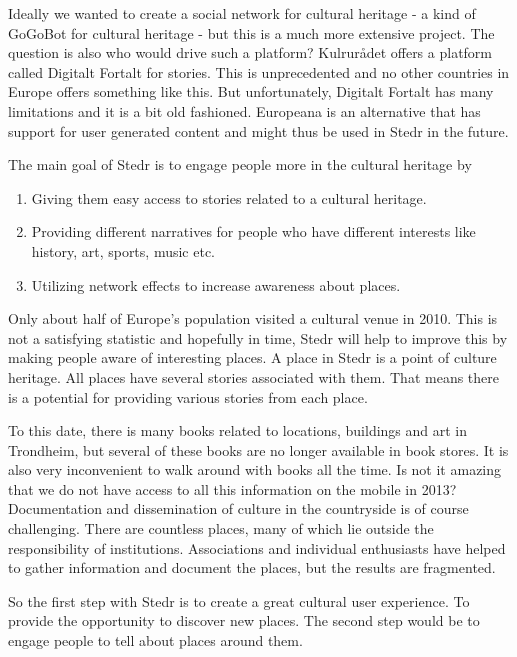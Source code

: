 Ideally we wanted to create a social network for cultural heritage - a kind of GoGoBot for cultural heritage - but this is a much more extensive project. The question is also who would drive such a platform? Kulrurådet offers a platform called Digitalt Fortalt for stories. This is unprecedented and no other countries in Europe offers something like this. But unfortunately, Digitalt Fortalt has many limitations and it is a bit old fashioned. Europeana is an alternative that has support for user generated content and might thus be used in Stedr in the future.

The main goal of Stedr is to engage people more in the cultural heritage by
\begin{enumerate}
\item Giving them easy access to stories related to a cultural heritage. \item Providing different narratives for people who have different interests like history, art, sports, music etc. \item Utilizing network effects to increase awareness about places.
\end{enumerate}

Only about half of Europe's population visited a cultural venue in 2010. This is not a satisfying statistic and hopefully in time, Stedr will help to improve this by making people aware of interesting places. A place in Stedr is a point of culture heritage. All places have several stories associated with them. That means there is a potential for providing various stories from each place.

To this date, there is many books related to locations, buildings and art in Trondheim, but several of these books are no longer available in book stores. It is also very inconvenient to walk around with books all the time. Is not it amazing that we do not have access to all this information on the mobile in 2013? Documentation and dissemination of culture in the countryside is of course challenging. There are countless places, many of which lie outside the responsibility of institutions. Associations and individual enthusiasts have helped to gather information and document the places, but the results are fragmented.

So the first step with Stedr is to create a great cultural user experience. To provide the opportunity to discover new places. The second step would be to engage people to tell about places around them.

\clearpage

